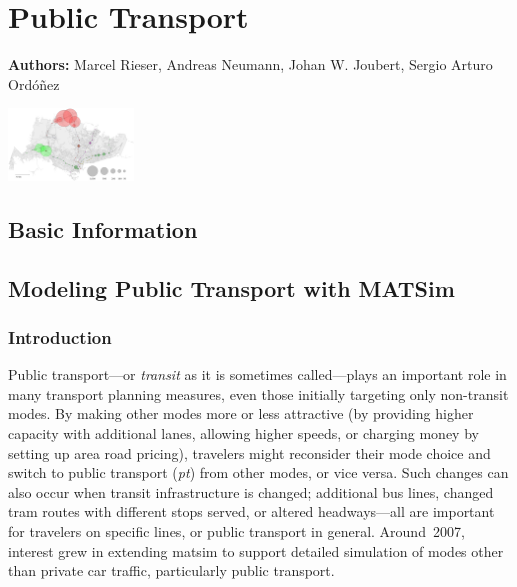 \chapter{Public Transport}
\label{ch:pt}

\hfill \textbf{Authors:} Marcel Rieser, Andreas Neumann, Johan W. Joubert, Sergio Arturo Ordóñez

\begin{center} \includegraphics[width=0.25\textwidth, angle=0]{extending/figures/ebr/Backwards.png} \end{center}


\section{Basic Information}

\section{Modeling Public Transport with MATSim}
\subsection{Introduction}
Public transport---or \emph{transit} as it is sometimes called---plays
an important role in many transport planning measures, even those initially
targeting only non-transit modes. By making other modes more or less
attractive (\eg by providing higher capacity with additional lanes, allowing
higher speeds, or charging money by setting up area road pricing), travelers
might reconsider their mode choice and switch to public transport (\emph{pt})
from other modes, or vice versa. Such changes can also occur when transit
infrastructure is changed; additional bus lines, changed tram routes with
different stops served, or altered headways---all are important for travelers
on specific lines, or public transport in general. Around~2007,
interest grew in extending \gls{matsim} to support detailed simulation of 
modes other than private car traffic, particularly public transport.

